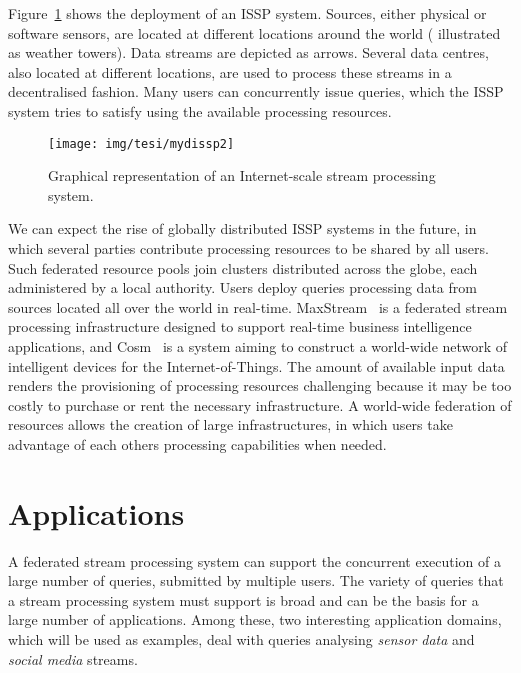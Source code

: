 Figure~\ref{fig:dissp} shows the deployment of an ISSP system. Sources, either physical or
software sensors, are located at different locations around the world (\ie
illustrated as weather towers). Data streams are depicted as arrows. Several data centres, also located
at different locations, are used to process these streams in a decentralised fashion. Many users can concurrently issue queries, which the
ISSP system tries to satisfy using the available processing resources.
\clearpage
\begin{figure}[t!] 
	\centering 
	\texttt{[image: img/tesi/mydissp2]} 
	\caption{Graphical representation of an Internet-scale stream processing system.}
	\label{fig:dissp}
\end{figure}
We can expect the rise of globally distributed ISSP systems in the future, in which several parties
contribute processing resources to be shared by all users. Such federated resource pools join clusters
distributed across the globe, each administered by a local authority. Users deploy queries processing data from sources located all over the world in real-time. MaxStream~\cite{maxstream} is a
federated stream processing infrastructure designed to support real-time business intelligence
applications, and Cosm~\cite{cosm} is a system aiming to construct a world-wide network of
intelligent devices for the \mbox{Internet-of-Things}.
The amount of available input data renders the provisioning of processing resources
challenging because it may be too costly to purchase or rent the necessary infrastructure. 
A world-wide federation of resources allows the creation of large infrastructures, in which
 users take advantage of each others processing capabilities when needed.


\section{Applications}

A federated stream processing system can support the concurrent execution of a
large number of queries, submitted by multiple users. 
The variety of queries that a stream processing system must support is broad and can be the basis for a
large number of applications.
Among these, two interesting application domains, which will be used as examples, deal with queries
analysing \emph{sensor data} and \emph{social media} streams.


